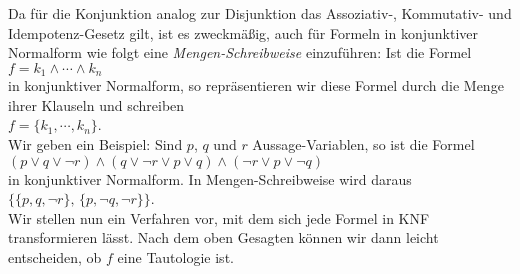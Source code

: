 Da f\"{u}r die Konjunktion analog zur Disjunktion das Assoziativ-, Kommutativ- und Idempotenz-Gesetz
gilt, ist es zweckm\"{a}\ss{}ig, auch f\"{u}r Formeln in konjunktiver Normalform wie folgt eine
\emph{\color{blue}Mengen-Schreibweise} einzuf\"{u}hren:  Ist die Formel
\\[0.2cm]
\hspace*{1.3cm} $f = k_1 \wedge \cdots \wedge k_n$
\\[0.2cm]
in konjunktiver Normalform, so repr\"{a}sentieren wir diese
Formel  durch die Menge ihrer Klauseln und schreiben \\[0.2cm]
\hspace*{1.3cm} $f = \{ k_1, \cdots, k_n \}$. 
\\[0.2cm]
Wir geben ein Beispiel:  Sind $p$, $q$ und $r$ Aussage-Variablen, so ist die Formel
\\[0.2cm]
\hspace*{1.3cm}
$(p \vee q \vee \neg r) \wedge (q \vee \neg r \vee p \vee q)\wedge (\neg r \vee p \vee \neg q)$
\\[0.2cm]
in konjunktiver Normalform.  In Mengen-Schreibweise wird daraus
\\[0.2cm]
\hspace*{1.3cm}
$\bigl\{ \{p, q, \neg r \},\, \{ p, \neg q, \neg r \} \bigr\}$.
\\[0.2cm]
Wir stellen nun ein Verfahren vor, mit dem sich jede Formel in KNF transformieren l\"{a}sst.  Nach
dem oben Gesagten k\"{o}nnen wir dann leicht entscheiden, ob $f$ eine Tautologie ist.
